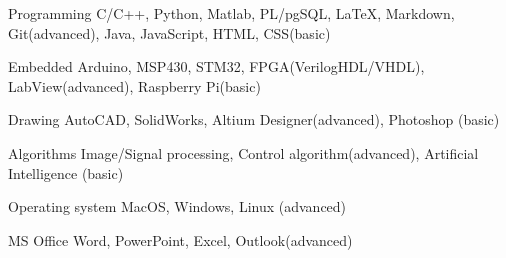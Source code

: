 

\begin{cvskills}

  \cvskill
    {Programming} %
    {C/C++, Python, Matlab, PL/pgSQL, \LaTeX, Markdown, Git(advanced), Java, JavaScript, HTML, CSS(basic)} %

  \cvskill
    {Embedded} %
    {Arduino, MSP430, STM32,  FPGA(VerilogHDL/VHDL), LabView(advanced), Raspberry Pi(basic)} %

  \cvskill
    {Drawing} %
    {AutoCAD, SolidWorks, Altium Designer(advanced), Photoshop (basic)} %

  \cvskill
    {Algorithms} %
    {Image/Signal processing, Control algorithm(advanced), Artificial Intelligence (basic)} %

  \cvskill
	{Operating system} %
	{MacOS, Windows, Linux (advanced)} %

  \cvskill
	{MS Office} %
	{Word, PowerPoint, Excel, Outlook(advanced)} %


\end{cvskills}
